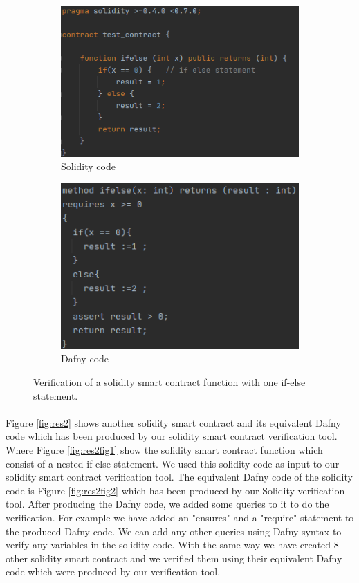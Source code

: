 \documentclass[11pt]{article}
\begin{document}
\begin{figure}
\begin{subfigure}{.52\textwidth}
  \centering
  \includegraphics[width=.8\linewidth]{figures/ifelse_sol.png}
  \caption{Solidity code}
  \label{fig:res1fig1}
\end{subfigure}%
\begin{subfigure}{.48\textwidth}
  \centering
  \includegraphics[width=.8\linewidth]{figures/ifels_dfy.png}
  \caption{Dafny code}
  \label{fig:res1fig2}
\end{subfigure}
\caption{Verification of a solidity smart contract function with one if-else statement.}
\label{fig:res1}
\end{figure}

\paragraph{}
Figure \ref{fig:res2} shows another solidity smart contract and its equivalent Dafny code which has been produced by our solidity smart contract verification tool. Where Figure \ref{fig:res2fig1} show the solidity smart contract function which consist of a nested if-else statement. We used this solidity code as input to our solidity smart contract verification tool. The equivalent Dafny code of the solidity code is Figure \ref{fig:res2fig2} which has been produced by our Solidity verification tool. After producing the Dafny code, we added some queries to it to do the verification. For example we have added an "ensures" and a "require" statement to the produced Dafny code. We can add any other queries using Dafny syntax to verify any variables in the solidity code. With the same way we have created 8 other solidity smart contract and we verified them using their equivalent Dafny code which were produced by our verification tool.
\end{document}

